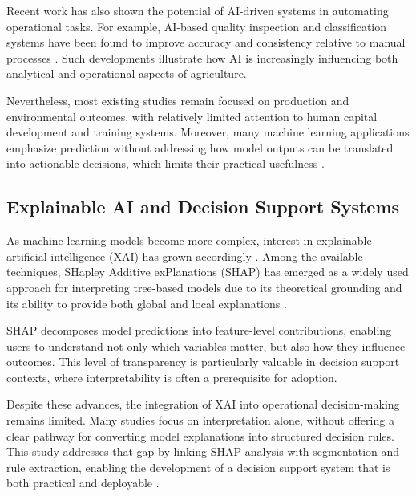 Recent work has also shown the potential of AI-driven systems in automating operational tasks. For example, AI-based quality inspection and classification systems have been found to improve accuracy and consistency relative to manual processes \cite{wonggasem2024}. Such developments illustrate how AI is increasingly influencing both analytical and operational aspects of agriculture.

Nevertheless, most existing studies remain focused on production and environmental outcomes, with relatively limited attention to human capital development and training systems. Moreover, many machine learning applications emphasize prediction without addressing how model outputs can be translated into actionable decisions, which limits their practical usefulness \cite{ryo2022}.

\subsection{Explainable AI and Decision Support Systems}

As machine learning models become more complex, interest in explainable artificial intelligence (XAI) has grown accordingly \cite{arrieta2020,lipton2018}. Among the available techniques, SHapley Additive exPlanations (SHAP) has emerged as a widely used approach for interpreting tree-based models due to its theoretical grounding and its ability to provide both global and local explanations \cite{lundberg2017}.

SHAP decomposes model predictions into feature-level contributions, enabling users to understand not only which variables matter, but also how they influence outcomes. This level of transparency is particularly valuable in decision support contexts, where interpretability is often a prerequisite for adoption.

Despite these advances, the integration of XAI into operational decision-making remains limited. Many studies focus on interpretation alone, without offering a clear pathway for converting model explanations into structured decision rules. This study addresses that gap by linking SHAP analysis with segmentation and rule extraction, enabling the development of a decision support system that is both practical and deployable \cite{yang2025,zhang2026}.
